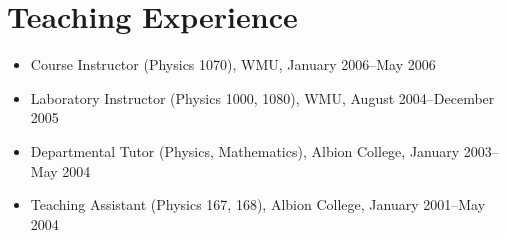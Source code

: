 \section*{Teaching Experience}
\begin{itemize}
	\item Course Instructor (Physics 1070), WMU, January 2006--May 2006
	\item Laboratory Instructor (Physics 1000, 1080), %
	 WMU, August 2004--December 2005
	\item Departmental Tutor (Physics, Mathematics), Albion College, January 2003--May 2004
	\item Teaching Assistant (Physics 167, 168), Albion College, January 2001--May 2004
\end{itemize}

